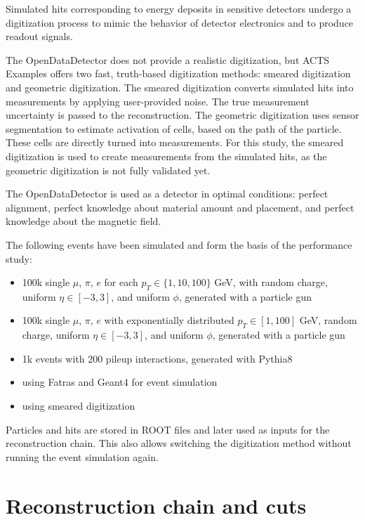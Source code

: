 Simulated hits corresponding to energy deposits in sensitive detectors undergo a digitization process to mimic the behavior of detector electronics and to produce readout signals.

The OpenDataDetector does not provide a realistic digitization, but ACTS Examples offers two fast, truth-based digitization methods: smeared digitization and geometric digitization. The smeared digitization converts simulated hits into measurements by applying user-provided noise. The true measurement uncertainty is passed to the reconstruction. The geometric digitization uses sensor segmentation to estimate activation of cells, based on the path of the particle. These cells are directly turned into measurements. For this study, the smeared digitization is used to create measurements from the simulated hits, as the geometric digitization is not fully validated yet.

The OpenDataDetector is used as a detector in optimal conditions: perfect alignment, perfect knowledge about material amount and placement, and perfect knowledge about the magnetic field.

The following events have been simulated and form the basis of the performance study:
\begin{itemize}
    \item 100k single $\mu$, $\pi$, $e$ for each $p_T \in \{1,10,100\}$ GeV, with random charge, uniform $\eta \in [-3,3]$, and uniform $\phi$, generated with a particle gun
    \item 100k single $\mu$, $\pi$, $e$ with exponentially distributed $p_T \in [1,100]$ GeV, random charge, uniform $\eta \in [-3,3]$, and uniform $\phi$, generated with a particle gun
    \item 1k \ttbar events with 200 pileup interactions, generated with Pythia8
    \item using Fatras and Geant4 for event simulation
    \item using smeared digitization
\end{itemize}

Particles and hits are stored in ROOT \cite{root} files and later used as inputs for the reconstruction chain. This also allows switching the digitization method without running the event simulation again.

\section{Reconstruction chain and cuts}

